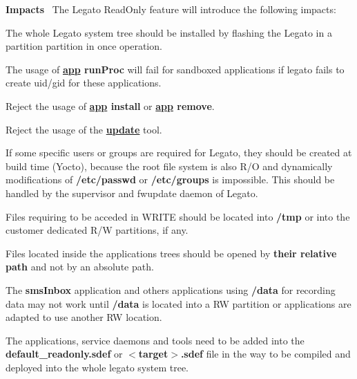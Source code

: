 {\bfseries Impacts}~\newline
 The Legato Read\+Only feature will introduce the following impacts\+:
\begin{DoxyItemize}
\item The whole Legato system tree should be installed by flashing the Legato in a partition partition in once operation.
\item The usage of {\bfseries {\ttfamily \hyperlink{toolsTarget_app}{app} run\+Proc}} will fail for sandboxed applications if legato fails to create uid/gid for these applications.
\item Reject the usage of {\bfseries {\ttfamily \hyperlink{toolsTarget_app}{app} install}} or {\bfseries {\ttfamily \hyperlink{toolsTarget_app}{app} remove}}.
\item Reject the usage of the {\bfseries {\ttfamily \hyperlink{toolsTarget_update}{update}}} tool.
\item If some specific users or groups are required for Legato, they should be created at build time (Yocto), because the root file system is also R/O and dynamically modifications of {\bfseries {\ttfamily /etc/passwd}} or {\bfseries {\ttfamily /etc/groups}} is impossible. This should be handled by the supervisor and fwupdate daemon of Legato.
\item Files requiring to be acceded in W\+R\+I\+TE should be located into {\bfseries {\ttfamily /tmp}} or into the customer dedicated R/W partitions, if any.
\item Files located inside the applications trees should be opened by {\bfseries their relative path} and not by an absolute path.
\item The {\bfseries {\ttfamily sms\+Inbox}} application and others applications using {\bfseries {\ttfamily /data}} for recording data may not work until {\bfseries {\ttfamily /data}} is located into a RW partition or applications are adapted to use another RW location.
\item The applications, service daemons and tools need to be added into the {\bfseries {\ttfamily default\+\_\+readonly.\+sdef}} or {\bfseries {\ttfamily $<$target$>$.sdef}} file in the way to be compiled and deployed into the whole legato system tree.
\end{DoxyItemize}

